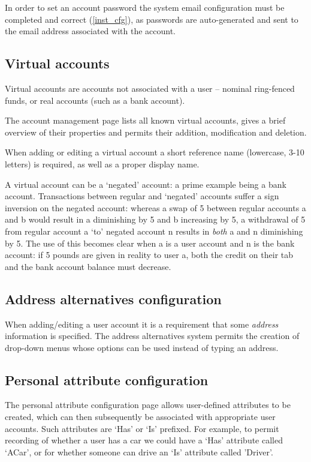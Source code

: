 \documentclass{report}
\begin{document}
In order to set an account password the system email configuration must be completed and correct (\autoref{inst_cfg}), as passwords are auto-generated and sent to the email address associated with the account.

\subsection{Virtual accounts}\label{manage_vaccts}

Virtual accounts are accounts not associated with a user -- nominal ring-fenced funds, or real accounts (such as a bank account).

The account management page lists all known virtual accounts, gives a brief overview of their properties and permits their addition, modification and deletion.

When adding or editing a virtual account a short reference name (lowercase, 3-10 letters) is required, as well as a proper display name.

A virtual account can be a `negated' account: a prime example being a bank account.  Transactions between regular and `negated' accounts suffer a sign inversion on the negated account: whereas a swap of 5 between regular accounts a and b would result in a diminishing by 5 and b increasing by 5, a withdrawal of 5 from regular account a `to' negated account n results in \emph{both} a and n diminishing by 5.  The use of this becomes clear when a is a user account and n is the bank account: if 5 pounds are given in reality to user a, both the credit on their tab and the bank account balance must decrease.

\subsection{Address alternatives configuration}\label{addr_alts}

When adding/editing a user account it is a requirement that some \textit{address} information is specified.  The address alternatives system permits the creation of drop-down menus whose options can be used instead of typing an address.

\subsection{Personal attribute configuration}\label{edit_attrs}

The personal attribute configuration page allows user-defined attributes to be created, which can then subsequently be associated with appropriate user accounts.  Such attributes are `Has' or `Is' prefixed.  For example, to permit recording of whether a user has a car we could have a `Has' attribute called `ACar', or for whether someone can drive an `Is' attribute called 'Driver'.
\end{document}
